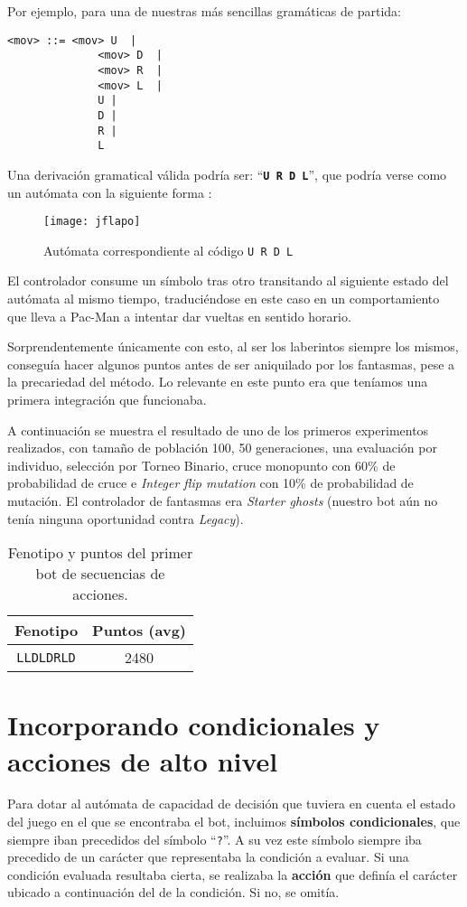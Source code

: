 Por ejemplo, para una de nuestras más sencillas gramáticas de partida:
\begin{lstlisting}[frame=single, breaklines=no, basicstyle=\fontsize{10}{11}\ttfamily, caption=Gramática básica para encadenar movimientos., captionpos=b]
    <mov> ::= <mov> U  | 
              <mov> D  | 
              <mov> R  | 
              <mov> L  |
              U | 
              D | 
              R |
              L
\end{lstlisting}

Una derivación gramatical válida podría ser: ``\textbf{\texttt{U R D L}}'', que podría verse como un autómata con la siguiente forma \cite{jflapPage}:
\begin{figure}[H]
\centering
\texttt{[image: jflapo]}
\caption{Autómata correspondiente al código \texttt{U R D L}}
\end{figure}

El controlador consume un símbolo tras otro transitando al siguiente estado del autómata al mismo tiempo, traduciéndose en este caso en un comportamiento que lleva a Pac-Man a intentar dar vueltas en sentido horario.
 
Sorprendentemente únicamente con esto, al ser los laberintos siempre los mismos, conseguía hacer algunos puntos antes de ser aniquilado por los fantasmas, pese a la precariedad del método. Lo relevante en este punto era que teníamos una primera integración que funcionaba.
 
A continuación se muestra el resultado de uno de los primeros experimentos realizados, con tamaño de población 100, 50 generaciones, una evaluación por individuo, selección por Torneo Binario, cruce monopunto con 60\% de probabilidad de cruce e \textit{Integer flip mutation} con 10\% de probabilidad de mutación. El controlador de fantasmas era \textit{Starter ghosts} (nuestro bot aún no tenía ninguna oportunidad contra \textit{Legacy}).
\begin{table}[H]
\centering
\begin{tabular}{cc}
\hline
\textbf{Fenotipo} & \textbf{Puntos (avg)} \\ \hline
\texttt{LLDLDRLD}          & 2480                  \\ \hline
\end{tabular}
\caption{Fenotipo y puntos del primer bot de secuencias de acciones.}
\end{table}

\section{Incorporando condicionales y acciones de alto nivel}
Para dotar al autómata de capacidad de decisión que tuviera en cuenta el estado del juego en el que se encontraba el bot, incluimos \textbf{símbolos condicionales}, que siempre iban precedidos del símbolo ``\texttt{?}''. A su vez este símbolo siempre iba precedido de un carácter que representaba la condición a evaluar.
Si una condición evaluada resultaba cierta, se realizaba la \textbf{acción} que definía el carácter ubicado a continuación del de la condición. Si no, se omitía. 

